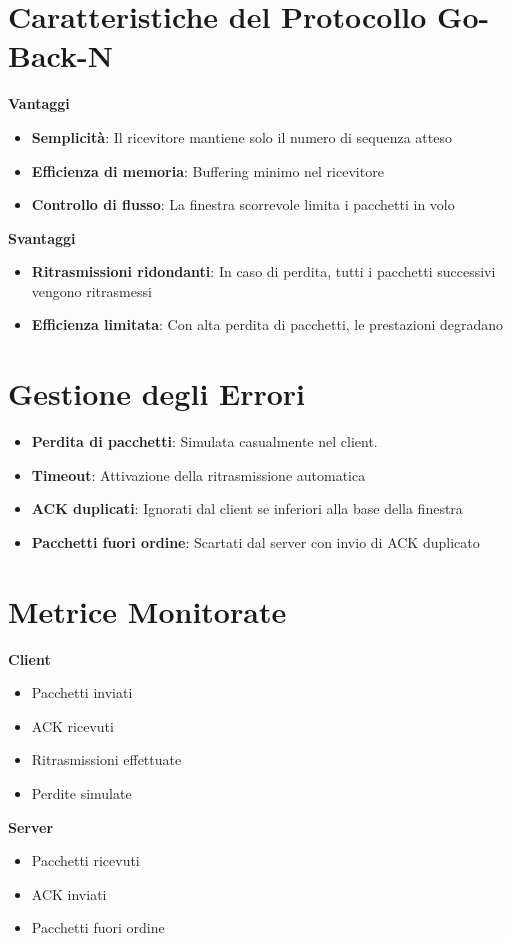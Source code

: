 \documentclass[a4paper,12pt]{article}
\begin{document}
\section{Caratteristiche del Protocollo Go-Back-N}
\textbf{Vantaggi}
\begin{itemize}
    \item \textbf{Semplicità}: Il ricevitore mantiene solo il numero di sequenza atteso
    \item \textbf{Efficienza di memoria}: Buffering minimo nel ricevitore
    \item \textbf{Controllo di flusso}: La finestra scorrevole limita i pacchetti in volo
\end{itemize}
\textbf{Svantaggi}
\begin{itemize}
    \item \textbf{Ritrasmissioni ridondanti}: In caso di perdita, tutti i pacchetti successivi vengono ritrasmessi
    \item \textbf{Efficienza limitata}: Con alta perdita di pacchetti, le prestazioni degradano
\end{itemize}
\section{Gestione degli Errori}
\begin{itemize}
    \item \textbf{Perdita di pacchetti}: Simulata casualmente nel client.
    \item \textbf{Timeout}: Attivazione della ritrasmissione automatica
    \item \textbf{ACK duplicati}: Ignorati dal client se inferiori alla base della finestra
    \item \textbf{Pacchetti fuori ordine}: Scartati dal server con invio di ACK duplicato
\end{itemize}
\section{Metrice Monitorate}
\textbf{Client}
\begin{itemize}
    \item Pacchetti inviati
    \item ACK ricevuti
    \item Ritrasmissioni effettuate
    \item Perdite simulate
\end{itemize}
\textbf{Server}
\begin{itemize}
    \item Pacchetti ricevuti
    \item ACK inviati
    \item Pacchetti fuori ordine
\end{itemize}
\end{document}
